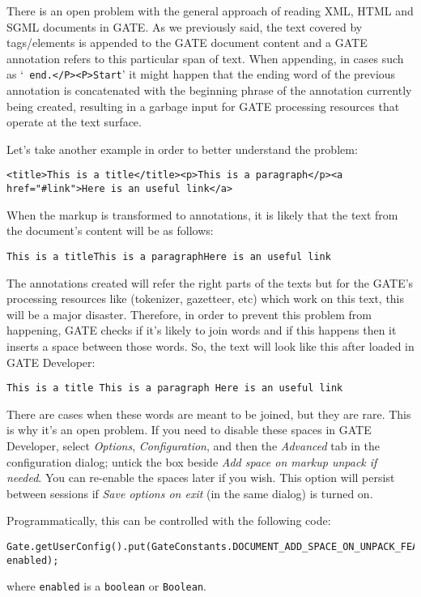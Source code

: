 There is an open problem with the general approach of reading XML, HTML and SGML
documents in GATE. As we previously said, the text covered by tags/elements is
appended to the GATE document content and a GATE annotation refers to this
particular span of text. When appending, in cases such as `{\tt
end.</P><P>Start}' it might happen that the ending word of the previous
annotation is concatenated with the beginning phrase of the annotation currently
being created, resulting in a garbage input for GATE processing resources that
operate at the text surface.

Let's take another example in order to better understand the
problem:

\small
\begin{small}
\begin{verbatim}
<title>This is a title</title><p>This is a paragraph</p><a
href="#link">Here is an useful link</a>
\end{verbatim}
\end{small}
\nnormalsize

When the markup is transformed to annotations, it is likely that
the text from the document's content will be as follows:

{\tt This is a titleThis is a paragraphHere is an useful link}

The annotations created will refer the right parts of the texts
but for the GATE's processing resources like (tokenizer, gazetteer,
etc) which work on this text, this will be a major disaster.
Therefore, in order to prevent this problem from happening, GATE
checks if it's likely to join words and if this happens then it
inserts a space between those words. So, the text will look like
this after loaded in GATE Developer:

{\tt This is a title This is a paragraph Here is an useful link}

There are cases when these words are meant to be joined, but they are rare. This
is why it's an open problem.  If you need to disable these spaces in GATE
Developer, select \emph{Options}, \emph{Configuration}, and then the
\emph{Advanced} tab in the configuration dialog; untick the box beside \emph{Add
  space on markup unpack if needed}.  You can re-enable the spaces later if you
wish.  This option will persist between sessions if \emph{Save options on exit}
(in the same dialog) is turned on.

Programmatically, this can be controlled with the following code:
%
\begin{verbatim}
Gate.getUserConfig().put(GateConstants.DOCUMENT_ADD_SPACE_ON_UNPACK_FEATURE_NAME, enabled);
\end{verbatim}
%
where \texttt{enabled} is a \texttt{boolean} or \texttt{Boolean}.



